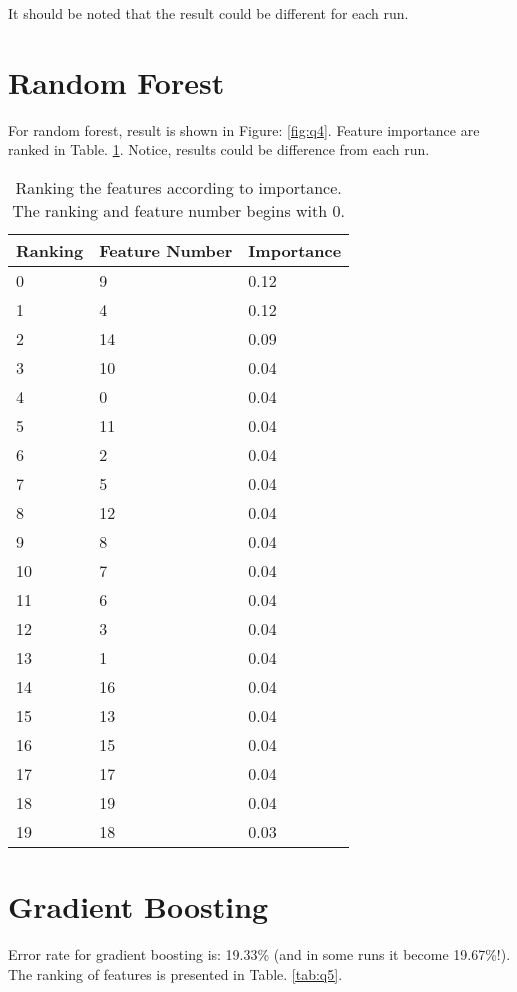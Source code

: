 \documentclass[11pt]{article}
\begin{document}
It should be noted that the result could be different for each run.



\clearpage
\section{Random Forest}

For random forest, result is shown in Figure: \ref{fig:q4}. Feature importance are ranked in Table. \ref{tab:q4}. Notice, results could be difference from each run.

\begin{table}[!htb]
\centering
\caption{Ranking the features according to importance. The ranking and feature number begins with 0.}
\label{tab:q4}
\begin{tabular}{lll}
\hline \hline
Ranking	&Feature Number	&Importance 	\\ \hline
0 &  9  &0.12 \\
1 &  4  &0.12 \\
2 & 14  &0.09 \\
3 & 10  &0.04 \\
4 &  0  &0.04 \\
5 & 11  &0.04 \\
6 &  2  &0.04 \\
7 &  5  &0.04 \\
8 & 12  &0.04 \\
9 &  8  &0.04 \\
10 &  7  &0.04 \\
11 &  6  &0.04 \\
12 &  3  &0.04 \\
13 &  1  &0.04 \\
14 & 16  &0.04 \\
15 & 13  &0.04 \\
16 & 15  &0.04 \\
17 & 17  &0.04 \\
18 & 19  &0.04 \\
19 & 18  &0.03 \\
\hline \hline
\end{tabular}
\end{table}



\clearpage
\section{Gradient Boosting}
Error rate for gradient boosting is: 19.33\% (and in some runs it become 19.67\%!). The ranking of features is presented in Table. \ref{tab:q5}.
\end{document}
